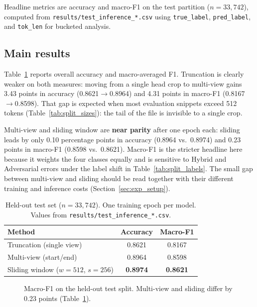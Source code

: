 \documentclass[10pt]{article}
\begin{document}
Headline metrics are accuracy and macro-F1 on the test partition ($n{=}33{,}742$), computed from \texttt{results/test\_inference\_*.csv} using \texttt{true\_label}, \texttt{pred\_label}, and \texttt{tok\_len} for bucketed analysis.

\subsection{Main results}
\label{sec:main_results}
Table~\ref{tab:main} reports overall accuracy and macro-averaged F1. Truncation is clearly weaker on both measures: moving from a single head crop to multi-view gains 3.43 points in accuracy (0.8621$\rightarrow$0.8964) and 4.31 points in macro-F1 (0.8167$\rightarrow$0.8598). That gap is expected when most evaluation snippets exceed 512 tokens (Table~\ref{tab:split_sizes}): the tail of the file is invisible to a single crop.

Multi-view and sliding window are \textbf{near parity} after one epoch each: sliding leads by only 0.10 percentage points in accuracy (0.8964 vs.\ 0.8974) and 0.23 points in macro-F1 (0.8598 vs.\ 0.8621). Macro-F1 is the stricter headline here because it weights the four classes equally and is sensitive to Hybrid and Adversarial errors under the label shift in Table~\ref{tab:split_labels}. The small gap between multi-view and sliding should be read together with their different training and inference costs (Section~\ref{sec:exp_setup}).

\begin{table}[htbp]
  \centering
  \caption{Held-out test set ($n{=}33{,}742$). One training epoch per model. Values from \texttt{results/test\_inference\_*.csv}.}
  \label{tab:main}
  \begin{tabular}{@{}lcc@{}}
    \toprule
    Method & Accuracy & Macro-F1 \\
    \midrule
    Truncation (single view)   & 0.8621 & 0.8167 \\
    Multi-view (start/end)     & 0.8964 & 0.8598 \\
    Sliding window ($w{=}512$, $s{=}256$) & \textbf{0.8974} & \textbf{0.8621} \\
    \bottomrule
  \end{tabular}
\end{table}

\begin{figure}[htbp]
  \centering
  \caption{Macro-F1 on the held-out test split. Multi-view and sliding differ by 0.23 points (Table~\ref{tab:main}).}
  \label{fig:macrof}
\end{figure}
\end{document}
